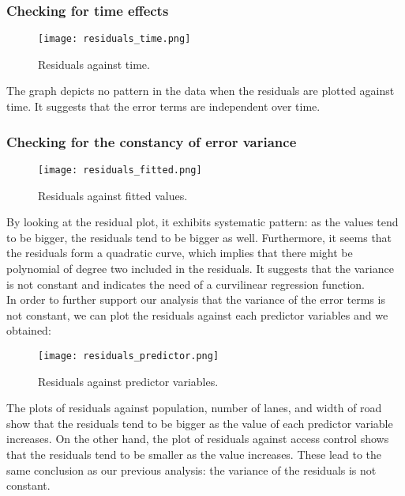 \documentclass[english]{article}
\begin{document}
\subsubsection{Checking for time effects}
\begin{figure}[H]
	\begin{centering}
  		\texttt{[image: residuals\_time.png]}
  		\caption{Residuals against time.\label{figure5}
}
	\end{centering}
\end{figure}
The graph depicts no pattern in the data when the residuals are plotted against time. It suggests that the error terms are independent over time. 

\subsubsection{Checking for the constancy of error variance}
\begin{figure}[H]
	\begin{centering}
  		\texttt{[image: residuals\_fitted.png]}
  		\caption{Residuals against fitted values.\label{figure6}
}
	\end{centering}
\end{figure}
By looking at the residual plot, it exhibits systematic pattern: as the values tend to be bigger, the residuals tend to be bigger as well. Furthermore, it seems that the residuals form a quadratic curve, which implies that there might be polynomial of degree two included in the residuals. It suggests that the variance is not constant and indicates the need of a curvilinear regression function. \\

In order to further support our analysis that the variance of the error terms is not constant, we can plot the residuals against each predictor variables and we obtained: 

\begin{figure}[H]
	\begin{centering}
  		\texttt{[image: residuals\_predictor.png]}
  		\caption{Residuals against predictor variables.\label{figure7}
}
	\end{centering}
\end{figure}

The plots of residuals against population, number of lanes, and width of road show that the residuals tend to be bigger as the value of each predictor variable increases. On the other hand, the plot of residuals against access control shows that the residuals tend to be smaller as the value increases. These lead to the same conclusion as our previous analysis: the variance of the residuals is not constant. 
\end{document}
